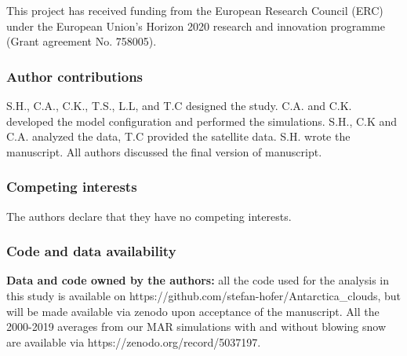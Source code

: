 \documentclass[draft]{agujournal2019}
\begin{document}
%
%
%
%
%
%
%
%


\acknowledgments
This project has received funding from the European Research Council (ERC) under the European Union’s Horizon 2020 research and innovation programme (Grant agreement No. 758005).

\subsubsection*{Author contributions}

S.H., C.A., C.K., T.S., L.L, and T.C designed the study. C.A. and C.K. developed the model configuration and performed the simulations. S.H., C.K and C.A. analyzed the data, T.C provided the satellite data. S.H. wrote the manuscript. All authors discussed the final version of manuscript.

\subsubsection*{Competing interests}
The authors declare that they have no competing interests.

\subsubsection*{Code and data availability}

%
\textbf{Data and code owned by the authors:} all the code used for the analysis in this study is available on https://github.com/stefan-hofer/Antarctica\_clouds, but will be made available via zenodo upon acceptance of the manuscript. All the 2000-2019 averages from our MAR simulations with and without blowing snow are available via \hfill \break  https://zenodo.org/record/5037197. 
\end{document}
